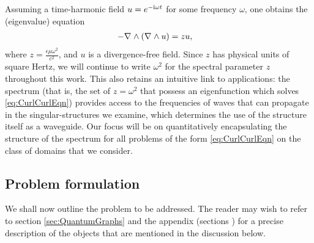 Assuming a time-harmonic field $u = e^{-\mathrm{i}\omega t}$ for some frequency $\omega$, one obtains the (eigenvalue) equation
\begin{align} \label{eq:CurlCurlEqn}
	- \nabla_{}\wedge\left(  \nabla_{}\wedge u  \right) &= zu,
\end{align}
where $z = \frac{\epsilon\mu\omega^2}{c^2}$, and $u$ is a divergence-free field.
Since $z$ has physical units of square Hertz, we will continue to write $\omega^2$ for the spectral parameter $z$ throughout this work.
This also retains an intuitive link to applications: the spectrum (that is, the set of $z=\omega^2$ that possess an eigenfunction which solves \eqref{eq:CurlCurlEqn}) provides access to the frequencies of waves that can propagate in the singular-structures we examine, which determines the use of the structure itself as a waveguide.
Our focus will be on quantitatively encapsulating the structure of the spectrum for all problems of the form \eqref{eq:CurlCurlEqn} on the class of domains that we consider.

\subsection{Problem formulation} \label{ssec:OurSystem}
We shall now outline the problem to be addressed.
The reader may wish to refer to section \ref{sec:QuantumGraphs} and the appendix (sections ) for a precise description of the objects that are mentioned in the discussion below. 

